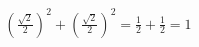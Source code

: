 \documentclass[preview]{standalone}
\begin{document}
\begin{align*}
\left(\frac{\sqrt{2}}{2}\right)^2 + \left(\frac{\sqrt{2}}{2}\right)^2 = \frac{1}{2} + \frac{1}{2} = 1
\end{align*}
\end{document}
